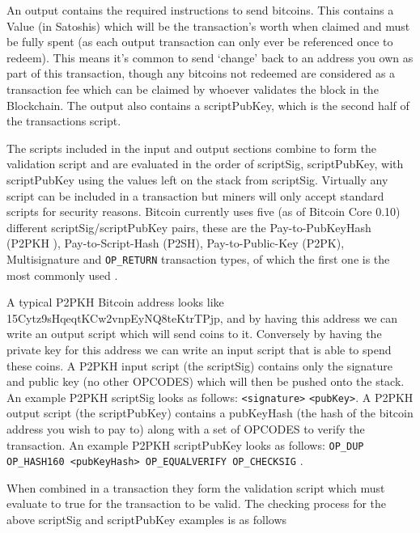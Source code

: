 \documentclass{article}
\begin{document}
An output contains the required instructions to send bitcoins. This contains a Value (in Satoshis) which will be the transaction’s worth when claimed and must be fully spent (as each output transaction can only ever be referenced once to redeem). This means it's common to send `change' back to an address you own as part of this transaction, though any bitcoins not redeemed are considered as a transaction fee which can be claimed by whoever validates the block in the Blockchain. The output also contains a scriptPubKey, which is the second half of the transactions script.

The scripts included in the input and output sections combine to form the validation script and are evaluated in the order of scriptSig, scriptPubKey, with scriptPubKey using the values left on the stack from scriptSig. Virtually any script can be included in a transaction but miners will only accept standard scripts for security reasons. Bitcoin currently uses five (as of Bitcoin Core 0.10) different scriptSig/scriptPubKey pairs, these are the Pay-to-PubKeyHash (P2PKH ), Pay-to-Script-Hash (P2SH), Pay-to-Public-Key (P2PK), Multisignature and \verb|OP_RETURN| transaction types, of which the first one is the most commonly used \citep{32_de_rosa_2015}\citep{33_kofler_2014}.

A typical P2PKH Bitcoin address looks like 15Cytz9sHqeqtKCw2vnpEyNQ8teKtrTPjp, and by having this address we can write an output script which will send coins to it. Conversely by having the private key for this address we can write an input script that is able to spend these coins. A P2PKH input script (the scriptSig) contains only the signature and public key (no other OPCODES) which will then be pushed onto the stack. An example P2PKH scriptSig looks as follows: \verb|<signature>| \verb|<pubKey>|. A P2PKH output script (the scriptPubKey) contains a pubKeyHash (the hash of the bitcoin address you wish to pay to) along with a set of OPCODES to verify the transaction. An example P2PKH scriptPubKey looks as follows: \verb|OP_DUP OP_HASH160 <pubKeyHash> OP_EQUALVERIFY OP_CHECKSIG| \citep{33_kofler_2014}\citep{30_transactions_-_bitcoin_wiki_2016}.

When combined in a transaction they form the validation script which must evaluate to true for the transaction to be valid. The checking process for the above scriptSig and scriptPubKey examples is as follows \citep{32_de_rosa_2015}\citep{30_transactions_-_bitcoin_wiki_2016}

\cleardoublepage
\end{document}
